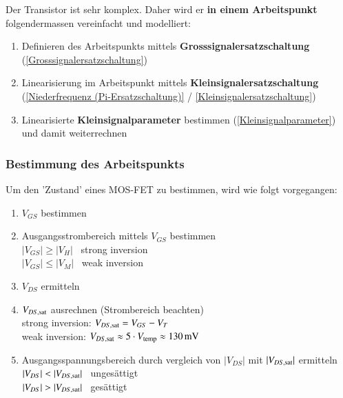 Der Transistor ist sehr komplex.
Daher wird er \textbf{in einem Arbeitspunkt} folgendermassen vereinfacht  und modelliert:

\begin{enumerate}
    \item Definieren des Arbeitspunkts mittels \textbf{Grosssignalersatzschaltung} (\ref{Grosssignalersatzschaltung})
    \item Linearisierung im Arbeitspunkt mittels \textbf{Kleinsignalersatzschaltung} (\ref{Niederfrequenz (Pi-Ersatzschaltung)} / \ref{Kleinsignalersatzschaltung})
    \item Linearisierte \textbf{Kleinsignalparameter} bestimmen (\ref{Kleinsignalparameter}) und damit weiterrechnen
\end{enumerate}


\subsubsection{Bestimmung des Arbeitspunkts}
\label{Bestimmung des Arbeitspunkts}
Um den 'Zustand' eines MOS-FET zu bestimmen, wird wie folgt vorgegangen:

\begin{minipage}[t]{0.44\columnwidth}
    \raggedright
    \begin{enumerate}
        \item $V_{GS}$ bestimmen 
        \item Ausgangsstrombereich mittels $V_{GS}$ bestimmen \\
            $|V_{GS}| \geq |V_H|$ \rightarrow\ strong inversion \\
            $|V_{GS}| \leq |V_M|$ \rightarrow\ weak inversion
        \item $V_{DS}$ ermitteln
    \end{enumerate}
\end{minipage}
\hfill
\begin{minipage}[t]{0.54\columnwidth}
    \raggedright
    \begin{enumerate}
        \setcounter{enumi}{3}
        \item $V_{DS, \rm sat}$ ausrechnen (Strombereich beachten)  \\
            strong inversion: $V_{DS, \rm sat} = V_{GS} - V_T$  \\
            weak inversion: $V_{DS, \rm sat} \approx 5 \cdot V_{\rm temp} \approx \qty{130}{\milli \volt}$ 
        \item Ausgangsspannungsbereich durch vergleich von $|V_{DS}|$ mit $|V_{DS, \rm sat}|$ ermitteln  \\
            $|V_{DS}| < |V_{DS, \rm sat}|$ \rightarrow\ ungesättigt \\
            $|V_{DS}| > |V_{DS, \rm sat}|$ \rightarrow\ gesättigt
    \end{enumerate}
\end{minipage}


